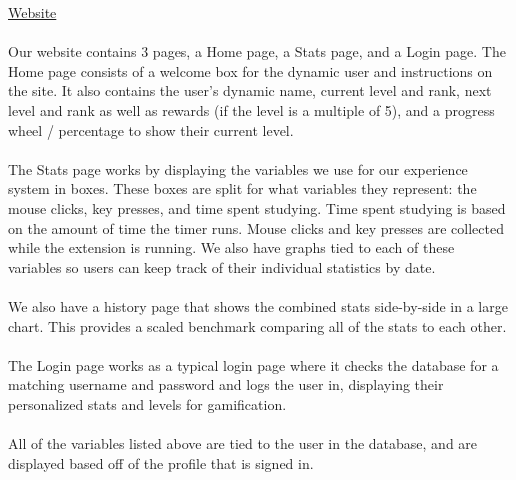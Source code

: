 \documentclass[12pt]{article}
\begin{document}
\noindent \underline{Website} \\\\\indent
Our website contains 3 pages, a Home page, a Stats page, and a Login page. The Home page consists of a welcome box for the dynamic user and instructions on the site. It also contains the user’s dynamic name, current level and rank, next level and rank as well as rewards (if the level is a multiple of 5), and a progress wheel / percentage to show their current level.
\\\\\indent The Stats page works by displaying the variables we use for our experience system in boxes. These boxes are split for what variables they represent: the mouse clicks, key presses, and time spent studying. Time spent studying is based on the amount of time the timer runs. Mouse clicks and key presses are collected while the extension is running. We also have graphs tied to each of these variables so users can keep track of their individual statistics by date.
\\\\\indent We also have a history page that shows the combined stats side-by-side in a large chart. This provides a scaled benchmark comparing all of the stats to each other.
\\\\\indent The Login page works as a typical login page where it checks the database for a matching username and password and logs the user in, displaying their personalized stats and levels for gamification.
\\\\\indent All of the variables listed above are tied to the user in the database, and are displayed based off of the profile that is signed in.
\\\\
\end{document}
